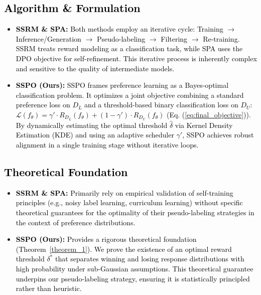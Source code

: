 \documentclass{article} %
\newcommand\rebuttal[1]{\textcolor{black}{#1}}
\begin{document}
\subsection{\rebuttal{Algorithm \& Formulation}}
\begin{itemize}
    \item \rebuttal{\textbf{SSRM \& SPA:} Both methods employ an iterative cycle: Training $\rightarrow$ Inference/Generation $\rightarrow$ Pseudo-labeling $\rightarrow$ Filtering $\rightarrow$ Re-training. SSRM treats reward modeling as a classification task, while SPA uses the DPO objective for self-refinement. This iterative process is inherently complex and sensitive to the quality of intermediate models.}
    \item \rebuttal{\textbf{SSPO (Ours):} SSPO frames preference learning as a Bayes-optimal classification problem. It optimizes a joint objective combining a standard preference loss on $D_L$ and a threshold-based binary classification loss on $D_U$: $ \mathcal{L}(f_{\theta}) = \gamma' \cdot R_{D_L}(f_{\theta}) + (1-\gamma') \cdot R_{D_U}(f_{\theta})$ (Eq. (\ref{eq:final_objective})). By dynamically estimating the optimal threshold $\hat{\delta}$ via Kernel Density Estimation (KDE) and using an adaptive scheduler $\gamma'$, SSPO achieves robust alignment in a single training stage without iterative loops.}
\end{itemize}

\subsection{\rebuttal{Theoretical Foundation}}
\begin{itemize}
    \item \rebuttal{\textbf{SSRM \& SPA:} Primarily rely on empirical validation of self-training principles (e.g., noisy label learning, curriculum learning) without specific theoretical guarantees for the optimality of their pseudo-labeling strategies in the context of preference distributions.}
    \item \rebuttal{\textbf{SSPO (Ours):} Provides a rigorous theoretical foundation (Theorem~\ref{theorem_1}). We prove the existence of an optimal reward threshold $\delta^*$ that separates winning and losing response distributions with high probability under sub-Gaussian assumptions. This theoretical guarantee underpins our pseudo-labeling strategy, ensuring it is statistically principled rather than heuristic.}
\end{itemize}
\end{document}

